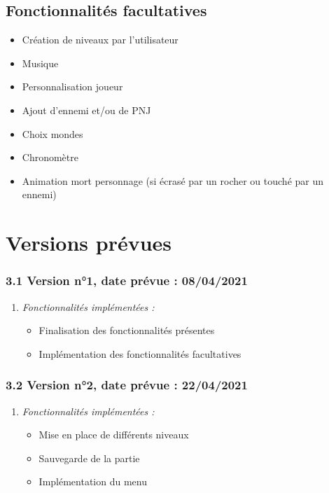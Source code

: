 \documentclass[french,a4paper,10pt]{article}
\begin{document}
\subsection{Fonctionnalités facultatives}
\begin{itemize}
    \item Création de niveaux par l’utilisateur
    \item Musique 
    \item Personnalisation joueur
    \item Ajout d’ennemi  et/ou de PNJ
    \item Choix mondes
    \item Chronomètre 
    \item Animation mort personnage (si écrasé par un rocher ou touché par un ennemi)
\end{itemize}

\vspace{0.5cm}
\section{Versions prévues}
\vspace{0.5cm}


\subsubsection*{3.1 Version n°1, date prévue : 08/04/2021}
\vspace{0.2cm}
\begin{enumerate}[label=]
\item \textit{Fonctionnalités implémentées :} 
\vspace{0.2cm}
   \begin{itemize}
       \item Finalisation des fonctionnalités présentes
       \item Implémentation des fonctionnalités facultatives
   \end{itemize}
   \end{enumerate}
   
\subsubsection*{3.2 Version n°2, date prévue : 22/04/2021}
\vspace{0.2cm}
\begin{enumerate}[label=]
\item \textit{Fonctionnalités implémentées :} 
\vspace{0.2cm}
   \begin{itemize}
       \item Mise en place de différents niveaux
       \item Sauvegarde de la partie
       \item Implémentation du menu
   \end{itemize}
   \end{enumerate}
\end{document}
